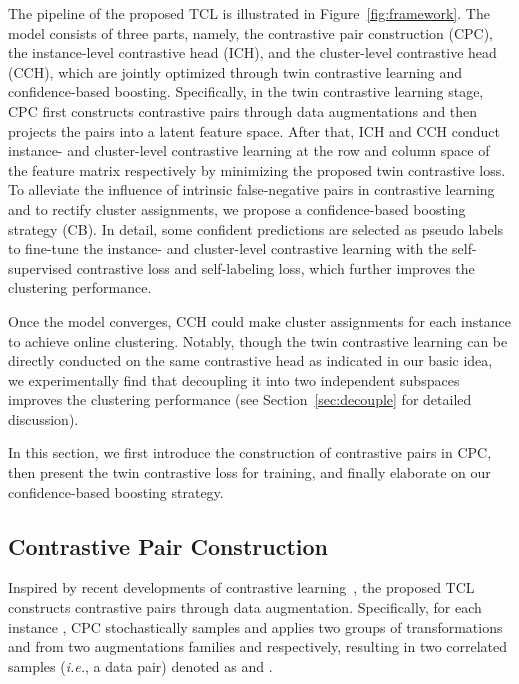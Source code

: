 The pipeline of the proposed TCL is illustrated in Figure~\ref{fig:framework}. The model consists of three parts, namely, the contrastive pair construction (CPC), the instance-level contrastive head (ICH), and the cluster-level contrastive head (CCH), which are jointly optimized through twin contrastive learning and confidence-based boosting. Specifically, in the twin contrastive learning stage, CPC first constructs contrastive pairs through data augmentations and then projects the pairs into a latent feature space. After that, ICH and CCH conduct instance- and cluster-level contrastive learning at the row and column space of the feature matrix respectively by minimizing the proposed twin contrastive loss. To alleviate the influence of intrinsic false-negative pairs in contrastive learning and to rectify cluster assignments, we propose a confidence-based boosting strategy (CB). In detail, some confident predictions are selected as pseudo labels to fine-tune the instance- and cluster-level contrastive learning with the self-supervised contrastive loss and self-labeling loss, which further improves the clustering performance.

Once the model converges, CCH could make cluster assignments for each instance to achieve online clustering. Notably, though the twin contrastive learning can be directly conducted on the same contrastive head as indicated in our basic idea, we experimentally find that decoupling it into two independent subspaces improves the clustering performance (see Section~\ref{sec:decouple} for detailed discussion).

In this section, we first introduce the construction of contrastive pairs in CPC, then present the twin contrastive loss for training, and finally elaborate on our confidence-based boosting strategy.

\subsection{Contrastive Pair Construction}

Inspired by recent developments of contrastive learning~\citep{SimCLR, SWAV}, the proposed TCL constructs contrastive pairs through data augmentation. Specifically, for each instance , CPC stochastically samples and applies two groups of transformations  and  from two augmentations families  and  respectively, resulting in two correlated samples (\textit{i.e.}, a data pair) denoted as  and .

